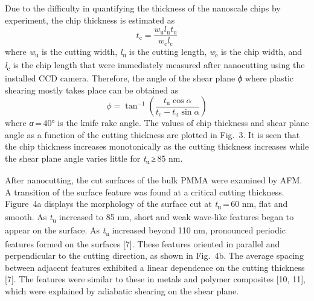 \documentclass{article}
\begin{document}
Due to the difficulty in quantifying the thickness of the nanoscale chips by experiment, the chip thickness is estimated as
\begin{equation*}
t_\mathrm{c} = \frac{w_\mathrm{u} l_\mathrm{u} t_\mathrm{u}}{w_\mathrm{c} l_\mathrm{c}} \tag{1}
\end{equation*}
where \emph{w}\textsubscript{u} is the cutting width, \emph{l}\textsubscript{u} is the cutting length, \emph{w}\textsubscript{c} is the chip width, and \emph{l}\textsubscript{c} is the chip length that were immediately measured after nanocutting using the installed CCD camera. Therefore, the angle of the shear plane \emph{ϕ} where plastic shearing mostly takes place can be obtained as
\begin{equation*}
\phi = \tan^{-1}\left(\frac{t_\mathrm{u}\cos\alpha}{t_\mathrm{c} - t_\mathrm{u}\sin\alpha}\right) \tag{2}
\end{equation*}
where \emph{α}\,=\,40° is the knife rake angle. The values of chip thickness and shear plane angle as a function of the cutting thickness are plotted in Fig.~3. It is seen that the chip thickness increases monotonically as the cutting thickness increases while the shear plane angle varies little for \emph{t}\textsubscript{u}\,≥\,85 nm.

After nanocutting, the cut surfaces of the bulk PMMA were examined by AFM. A transition of the surface feature was found at a critical cutting thickness. Figure~4a displays the morphology of the surface cut at \emph{t}\textsubscript{u}\,=\,60 nm, flat and smooth. As \emph{t}\textsubscript{u} increased to 85 nm, short and weak wave-like features began to appear on the surface. As \emph{t}\textsubscript{u} increased beyond 110 nm, pronounced periodic features formed on the surfaces [7]. These features oriented in parallel and perpendicular to the cutting direction, as shown in Fig.~4b. The average spacing between adjacent features exhibited a linear dependence on the cutting thickness [7]. The features were similar to these in metals and polymer composites [10, 11], which were explained by adiabatic shearing on the shear plane.
\end{document}
